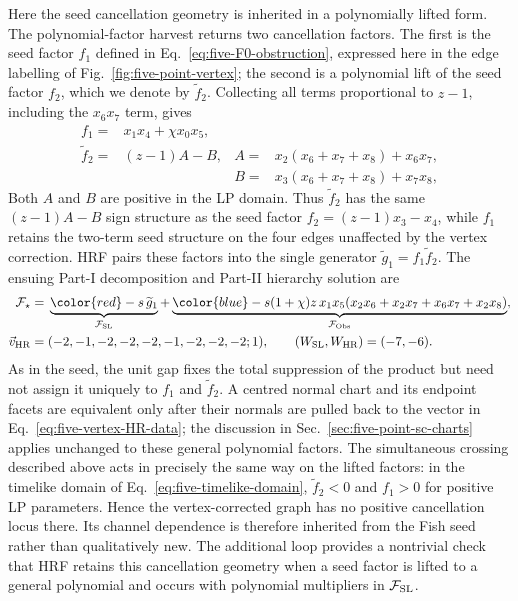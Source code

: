 \documentclass[a4paper,11pt]{article}
\newcommand{\FSL}{\mathcal F_{\rm SL}}
\newcommand{\FObs}{\mathcal F_{\rm Obs}}
\newcommand{\WSL}{W_{\rm SL}}
\newcommand{\WHR}{W_{\rm HR}}
\newcommand{\vHR}{\vec v_{\rm HR}}
\newcommand{\SLcolour}[1]{{\color{red}#1}}
\newcommand{\HRcolour}[1]{{\color{blue}#1}}
\begin{document}
Here the seed cancellation geometry is inherited in a polynomially lifted
form.  The polynomial-factor harvest returns two cancellation factors.  The
first is the seed factor \(f_1\) defined in
Eq.~\eqref{eq:five-F0-obstruction}, expressed here in the edge labelling of
Fig.~\ref{fig:five-point-vertex}; the second is a polynomial lift of the seed
factor \(f_2\), which we denote by \(\widetilde f_2\).  Collecting all terms
proportional to \(z-1\), including the \(x_6x_7\) term, gives
\begin{align}
 f_1={}&x_1x_4+\chi x_0x_5,
 \nonumber\\
 \widetilde f_2={}&(z-1)A-B,
 &A={}&x_2(x_6+x_7+x_8)+x_6x_7,
 \nonumber\\
 &&B={}&x_3(x_6+x_7+x_8)+x_7x_8,
 \label{eq:five-vertex-factors}
\end{align}
Both \(A\) and \(B\) are positive in the LP domain.  Thus \(\widetilde f_2\) has the
same \((z-1)A-B\) sign structure as the seed factor
\(f_2=(z-1)x_3-x_4\), while \(f_1\) retains the two-term seed structure on
the four edges unaffected by the vertex correction.  HRF pairs these factors
into the single generator \(\widetilde g_1=f_1\widetilde f_2\).  The ensuing Part-I
decomposition and Part-II hierarchy solution are
\begin{equation}
\begin{aligned}
 \mathcal F_\star={}&
 \underbrace{\SLcolour{-s\,\widetilde g_1}}_{\FSL}
 +\underbrace{\HRcolour{-s(1+\chi)z\,x_1x_5
 (x_2x_6+x_2x_7+x_6x_7+x_2x_8)}}_{\FObs},\\
 \vHR={}&(-2,-1,-2,-2,-2,-1,-2,-2,-2;1),
 \qquad (\WSL,\WHR)=(-7,-6).
\end{aligned}
 \label{eq:five-vertex-HR-data}
\end{equation}
As in the seed, the unit gap fixes the total suppression of the product but
need not assign it uniquely to \(f_1\) and \(\widetilde f_2\).  A centred normal chart
and its endpoint facets are equivalent only after their normals are pulled
back to the vector in Eq.~\eqref{eq:five-vertex-HR-data}; the discussion in
Sec.~\ref{sec:five-point-sc-charts} applies unchanged to these general
polynomial factors.
The simultaneous crossing described above acts in precisely the same way on
the lifted factors: in the timelike domain of
Eq.~\eqref{eq:five-timelike-domain}, \(\widetilde f_2<0\) and \(f_1>0\) for positive LP
parameters.  Hence the vertex-corrected graph has no positive cancellation
locus there.  Its channel dependence is therefore inherited from the Fish
seed rather than qualitatively new.  The additional loop provides a nontrivial
check that HRF retains this cancellation geometry when a seed factor is lifted
to a general polynomial and occurs with polynomial multipliers in \(\FSL\).
\end{document}
